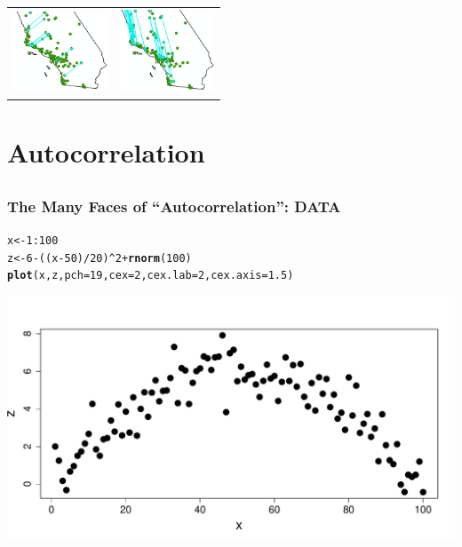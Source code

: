 \documentclass[mathserif,compress]{beamer}\usepackage{graphicx, color}
\makeatletter
\newcommand{\hlfunctioncall}[1]{\textcolor[rgb]{0.501960784313725,0,0.329411764705882}{\textbf{#1}}}%
\newenvironment{kframe}{%
 \def\at@end@of@kframe{}%
 \ifinner\ifhmode%
  \def\at@end@of@kframe{\end{minipage}}%
  \begin{minipage}{\columnwidth}%
 \fi\fi%
 \def\FrameCommand##1{\hskip\@totalleftmargin \hskip-\fboxsep
 \colorbox{shadecolor}{##1}\hskip-\fboxsep
     \hskip-\linewidth \hskip-\@totalleftmargin \hskip\columnwidth}%
 \MakeFramed {\advance\hsize-\width
   \@totalleftmargin\z@ \linewidth\hsize
   \@setminipage}}%
 {\par\unskip\endMakeFramed%
 \at@end@of@kframe}
\newenvironment{knitrout}{}{} %
\makeatother
\begin{document}
\begin{frame}
\begin{tabular} {p{5cm} p{4cm}}
 		\\
		\vspace{-.8cm}
		\hspace{1cm} 
		\includegraphics[width=2.8cm]{figure/sCalOzoneDistances1.jpg} &
		\vspace{-.8cm}
		\includegraphics[width=2.8cm]{figure/sCalOzoneDistances2.jpg} 

	\end{tabular}

\end{frame}

\section{Autocorrelation}
\subsection{}
\begin{frame} [fragile]
\frametitle{The Many Faces of ``Autocorrelation'': DATA}
     
\begin{knitrout}\tiny
{}\color{fgcolor}\begin{kframe}
\begin{alltt}
x <- 1:100
z <- 6 - ((x - 50)/20)^2 + \hlfunctioncall{rnorm}(100)
\hlfunctioncall{plot}(x, z, pch = 19, cex = 2, cex.lab = 2, cex.axis = 1.5)
\end{alltt}
\end{kframe}

{\centering \includegraphics[width=.7\linewidth]{figure/AutoCor-DataFig} 

}



\end{knitrout}

\end{frame}
\end{document}
